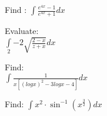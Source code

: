 	 \item Find : $\int \frac{e^{4x}-1}{e^{4x}+1}dx$
	 \item Evaluate:\\
		 $\int\limits_{2}{-2} \sqrt{\frac{2-x}{z+x}}dx$ 
	 \item Find: \\
		$\int \frac{1}{x[(logx)^{2} - 3logx - 4]}dx$
	\item Find: $\int x^{2} \cdot \sin^{-1} (x^{\frac{3}{2}})dx$ 
